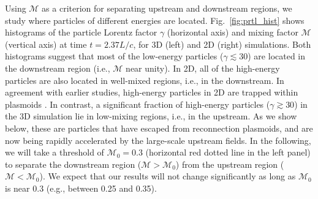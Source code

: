 \documentclass[twocolumn,twocolappendix]{aastex63}
\begin{document}

Using $\mathcal{M}$ as a criterion for separating upstream and downstream regions, we study where particles of different energies are located. Fig.~\ref{fig:prtl_hist} shows histograms of the particle Lorentz factor $\gamma$ (horizontal axis) and mixing factor $\mathcal{M}$ (vertical axis) at time $t=2.37L/c$, for 3D (left) and 2D (right) simulations. Both histograms suggest that most of the low-energy particles ($\gamma\lesssim30$) are located in the downstream region ({i.e.,} $\mathcal{M}$ near unity). In 2D, all of the high-energy particles are also located in well-mixed regions, i.e., in the downstream. In agreement with earlier studies, high-energy particles in 2D are trapped within plasmoids \citep[][]{sironi_16,petropoulou_18,hakobyan_20}.
In contrast, a significant %
fraction of high-energy particles ($\gamma\gtrsim30$) in the 3D simulation lie in low-mixing regions, i.e., in the upstream. As we show below, these are particles that have escaped from reconnection plasmoids, and are now being rapidly accelerated by the large-scale upstream fields. In the following, we will take a threshold of $\mathcal{M}_0 = 0.3$ (horizontal red dotted line in the left panel) to separate the downstream region ($\mathcal{M} > \mathcal{M}_0$) from the upstream region ($\mathcal{M} < \mathcal{M}_0$). We expect that our results will not change significantly as long as $\mathcal{M}_0$ is near $0.3$ (e.g., between 0.25 and 0.35).

\end{document}

